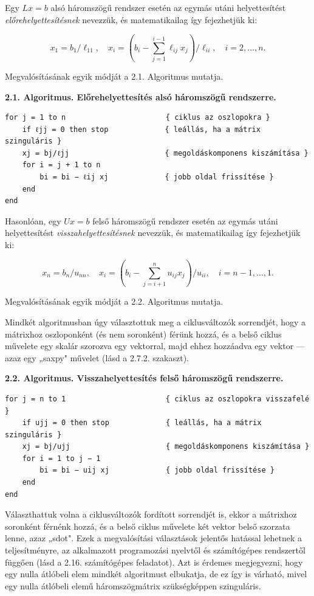 \documentclass[
  magyar,
  11pt]{article}
\begin{document}
Egy \(Lx = b\) alsó háromszögű rendszer esetén az egymás utáni
helyettesítést \emph{előrehelyettesítésnek} nevezzük, és matematikailag
így fejezhetjük ki:

\[x_1 = b_1/\ell_{11}, \quad x_i = \left(b_i - \sum_{j=1}^{i-1} \ell_{ij} x_j\right)/\ell_{ii}, \quad i = 2, \dots, n.\]

Megvalósításának egyik módját a 2.1. Algoritmus mutatja.

\textbf{2.1. Algoritmus. Előrehelyettesítés alsó háromszögű rendszerre.}

\begin{verbatim}
for j = 1 to n                       { ciklus az oszlopokra }
    if ℓjj = 0 then stop             { leállás, ha a mátrix szinguláris }
    xj = bj/ℓjj                      { megoldáskomponens kiszámítása }
    for i = j + 1 to n
        bi = bi − ℓij xj             { jobb oldal frissítése }
    end
end
\end{verbatim}

Hasonlóan, egy \(Ux = b\) felső háromszögű rendszer esetén az egymás
utáni helyettesítést \emph{visszahelyettesítésnek} nevezzük, és
matematikailag így fejezhetjük ki:

\[x_n = b_n/u_{nn}, \quad x_i = \left(b_i - \sum_{j=i+1}^n u_{ij}x_j\right)/u_{ii}, \quad i = n-1, \dots, 1.\]

Megvalósításának egyik módját a 2.2. Algoritmus mutatja.

Mindkét algoritmusban úgy választottuk meg a ciklusváltozók sorrendjét,
hogy a mátrixhoz oszloponként (és nem soronként) férünk hozzá, és a
belső ciklus művelete egy skalár szorozva egy vektorral, majd ehhez
hozzáadva egy vektor --- azaz egy „saxpy" művelet (lásd a 2.7.2.
szakaszt).

\textbf{2.2. Algoritmus. Visszahelyettesítés felső háromszögű
rendszerre.}

\begin{verbatim}
for j = n to 1                       { ciklus az oszlopokra visszafelé }
    if ujj = 0 then stop             { leállás, ha a mátrix szinguláris }
    xj = bj/ujj                      { megoldáskomponens kiszámítása }
    for i = 1 to j − 1
        bi = bi − uij xj             { jobb oldal frissítése }
    end
end
\end{verbatim}

Választhattuk volna a ciklusváltozók fordított sorrendjét is, ekkor a
mátrixhoz soronként férnénk hozzá, és a belső ciklus művelete két vektor
belső szorzata lenne, azaz „sdot". Ezek a megvalósítási választások
jelentős hatással lehetnek a teljesítményre, az alkalmazott programozási
nyelvtől és számítógépes rendszertől függően (lásd a 2.16. számítógépes
feladatot). Azt is érdemes megjegyezni, hogy egy nulla átlóbeli elem
mindkét algoritmust elbukatja, de ez így is várható, mivel egy nulla
átlóbeli elemű háromszögmátrix szükségképpen szinguláris.
\end{document}
